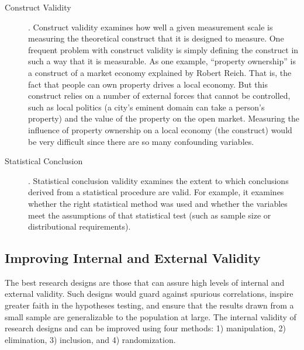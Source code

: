 \begin{description}
	\item[Construct Validity]. Construct validity examines how well a given measurement scale is measuring the theoretical construct that it is designed to measure. One frequent problem with construct validity is simply defining the construct in such a way that it is measurable. As one example, ``property ownership'' is a construct of a market economy explained by Robert Reich\cite{reich2016saving}. That is, the fact that people can own property drives a local economy. But this construct relies on a number of external forces that cannot be controlled, such as local politics (a city's eminent domain can take a person's property) and the value of the property on the open market. Measuring the influence of property ownership on a local economy (the construct) would be very difficult since there are so many confounding variables. 
	
	\item[Statistical Conclusion]. Statistical conclusion validity examines the extent to which conclusions derived from a statistical procedure are valid. For example, it examines whether the right statistical method was used and whether the variables meet the assumptions of that statistical test (such as sample size or distributional requirements). 
	
\end{description}


\subsection{Improving Internal and External Validity}

The best research designs are those that can assure high levels of internal and external validity. Such designs would guard against spurious correlations, inspire greater faith in the hypotheses testing, and ensure that the results drawn from a small sample are generalizable to the population at large. The internal validity of research designs and can be improved using four methods: 1) manipulation, 2) elimination, 3) inclusion, and 4) randomization.

